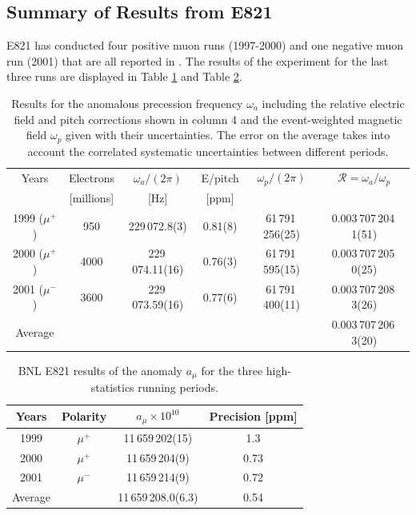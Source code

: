 \documentclass{outhesis}
\begin{document}
\subsection{Summary of Results from E821}

E821 has conducted four positive muon runs (1997-2000) and one negative muon run (2001) that are all reported in \cite{bnl}. The results of the experiment for the last three runs are displayed in Table \ref{tab:R} and Table \ref{tab:amu}.
\begin{table}
  \caption[Results for the anomalous precession frequency $\omega_a$]{Results for the anomalous precession frequency $\omega_a$ including the relative electric field and pitch corrections shown in column 4 and the event-weighted magnetic field $\omega_p$ given with their uncertainties. The error on the average takes into account the correlated systematic uncertainties between different periods.}
  \label{tab:R}
  \centering
  \begin{tabular}{*{6}{c}}
	\hline \hline
      Years  & Electrons & $\omega_a/(2\pi)$& E/pitch & $\omega_p/(2\pi)$ & $\mathcal{R} = \omega_a/\omega_p$\\ 
      &[millions] &  [Hz]  &  [ppm]  & & \\
      \hline
       1999 ($\mu^+$) & 950 & 229\,072.8(3) & 0.81(8) & 61\,791\,256(25)& 0.003\,707\,204\,1(51)  \\
       2000 ($\mu^+$) & 4000 & 229\,074.11(16) & 0.76(3) & 61\,791\,595(15)& 0.003\,707\,205\,0(25)  \\
       2001 ($\mu^-$)  & 3600 & 229\,073.59(16) & 0.77(6) & 61\,791\,400(11)& 0.003\,707\,208\,3(26)  \\  \hline
       Average & & & & & 0.003\,707\,206\,3(20) \\
         \hline  \hline
     \end{tabular}
\end{table}
\begin{table}
  \caption[BNL E821 results of the anomaly $a_{\mu}$]{BNL E821 results of the anomaly $a_{\mu}$ for the three high-statistics running periods. }
  \label{tab:amu}
  \centering
  \begin{tabular}{*{4}{c}}
	\hline \hline
      Years  & Polarity & $a_{\mu}\times 10^{10}$ & Precision [ppm] \\ \hline
       1999 & $\mu^+$ & 11\,659\,202(15) & 1.3  \\
       2000 & $\mu^+$ & 11\,659\,204(9) & 0.73  \\
       2001 & $\mu^-$ & 11\,659\,214(9) & 0.72  \\ \hline
       Average & & 11\,659\,208.0(6.3) & 0.54\\
         \hline  \hline
     \end{tabular}
\end{table}
\end{document}
